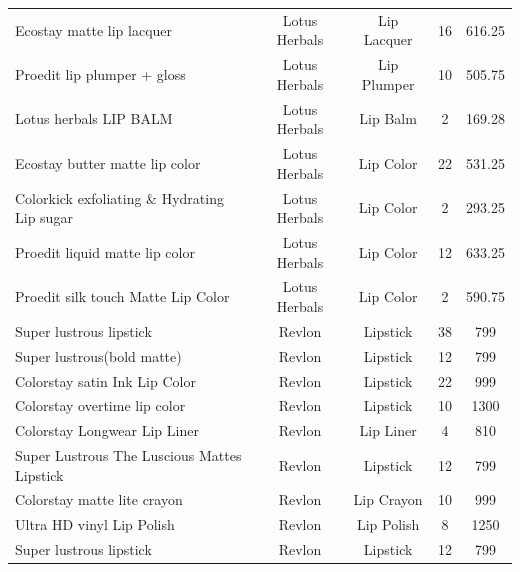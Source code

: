 \documentclass{article}
\begin{document}
\begin{longtable}{lcccc}
    Ecostay matte lip lacquer                           & Lotus Herbals   & Lip Lacquer     & 16              & 616.25         \\
    Proedit lip plumper + gloss                         & Lotus Herbals   & Lip Plumper     & 10              & 505.75         \\
    Lotus herbals LIP BALM                              & Lotus Herbals   & Lip Balm        & 2               & 169.28         \\
    Ecostay butter matte lip color                      & Lotus Herbals   & Lip Color       & 22              & 531.25         \\
    Colorkick exfoliating \& Hydrating Lip sugar        & Lotus Herbals   & Lip Color       & 2               & 293.25         \\
    Proedit liquid matte lip color                      & Lotus Herbals   & Lip Color       & 12              & 633.25         \\
    Proedit silk touch Matte Lip Color                  & Lotus Herbals   & Lip Color       & 2               & 590.75         \\
    Super lustrous lipstick                             & Revlon          & Lipstick        & 38              & 799            \\
    Super lustrous(bold matte)                          & Revlon          & Lipstick        & 12              & 799            \\
    Colorstay satin Ink Lip Color                       & Revlon          & Lipstick        & 22              & 999            \\
    Colorstay overtime lip color                        & Revlon          & Lipstick        & 10              & 1300           \\
    Colorstay Longwear  Lip Liner                       & Revlon          & Lip Liner       & 4               & 810            \\
    Super Lustrous The Luscious Mattes Lipstick         & Revlon          & Lipstick        & 12              & 799            \\
    Colorstay matte lite crayon                         & Revlon          & Lip Crayon      & 10              & 999            \\
    Ultra HD vinyl Lip Polish                           & Revlon          & Lip Polish      & 8               & 1250           \\
    Super lustrous lipstick                             & Revlon          & Lipstick        & 12              & 799            \\

\end{longtable}
\end{document}
